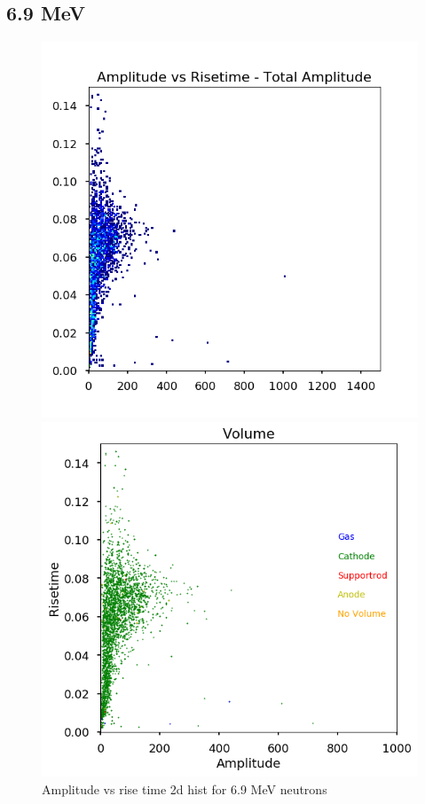 \documentclass[a4paper]{article}
\begin{document}
\subsection{6.9 MeV}
\begin{figure}[H]
    \centering
    \begin{minipage}{.5\textwidth}
        \centering
        \includegraphics[width=1\linewidth]{Fast/steel_achinos-2d_fast-7.png}
        \caption{Amplitude vs rise time 2d hist for 6.9 MeV neutrons}
        \label{fig:prob1_6_2}
    \end{minipage}%
    \begin{minipage}{0.5\textwidth}
        \centering
        \includegraphics[width=1\linewidth]{Fast/steel_achinos_vol_38_fast-7.png}

\end{minipage}
\end{figure}
\end{document}
